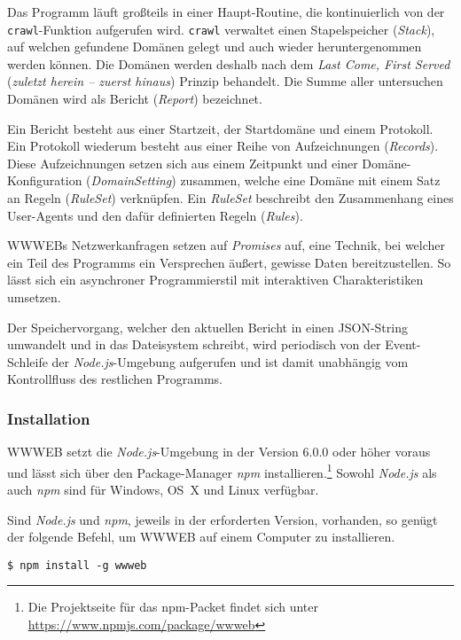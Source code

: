 Das Programm läuft großteils in einer Haupt-Routine, die kontinuierlich von der
\texttt{crawl}-Funktion aufgerufen wird. \texttt{crawl} verwaltet einen
Stapelspeicher (\emph{Stack}), auf welchen gefundene Domänen gelegt und auch
wieder heruntergenommen werden können. Die Domänen werden deshalb nach dem
\emph{Last Come, First Served} (\emph{zuletzt herein -- zuerst hinaus}) Prinzip
behandelt. Die Summe aller untersuchen Domänen wird als Bericht (\emph{Report})
bezeichnet.

Ein Bericht besteht aus einer Startzeit, der Startdomäne und einem Protokoll.
Ein Protokoll wiederum besteht aus einer Reihe von Aufzeichnungen
(\emph{Records}). Diese Aufzeichnungen setzen sich aus einem Zeitpunkt und
einer Domäne-Konfiguration (\emph{DomainSetting}) zusammen, welche eine Domäne
mit einem Satz an Regeln (\emph{RuleSet}) verknüpfen. Ein \emph{RuleSet}
beschreibt den Zusammenhang eines User-Agents und den dafür definierten Regeln
(\emph{Rules}).

WWWEBs Netzwerkanfragen setzen auf \emph{Promises} auf, eine Technik, bei
welcher ein Teil des Programms ein Versprechen äußert, gewisse Daten
bereitzustellen. So lässt sich ein asynchroner Programmierstil mit interaktiven
Charakteristiken umsetzen.

Der Speichervorgang, welcher den aktuellen Bericht in einen JSON-String
umwandelt und in das Dateisystem schreibt, wird periodisch von der
Event-Schleife der \emph{Node.js}-Umgebung aufgerufen und ist damit unabhängig
vom Kontrollfluss des restlichen Programms.

\subsubsection{Installation}
\label{ssub:wwweb_installation}

WWWEB setzt die \emph{Node.js}-Umgebung in der Version 6.0.0 oder höher voraus
und lässt sich über den Package-Manager \emph{npm} installieren.\footnote{Die
Projektseite für das npm-Packet findet sich unter
\url{https://www.npmjs.com/package/wwweb}} Sowohl \emph{Node.js} als auch
\emph{npm} sind für Windows, OS~X und Linux verfügbar.

Sind \emph{Node.js} und \emph{npm}, jeweils in der erforderten Version,
vorhanden, so genügt der folgende Befehl, um WWWEB auf einem Computer zu
installieren.

\begin{lstlisting}[language=shell]
$ npm install -g wwweb
\end{lstlisting}

